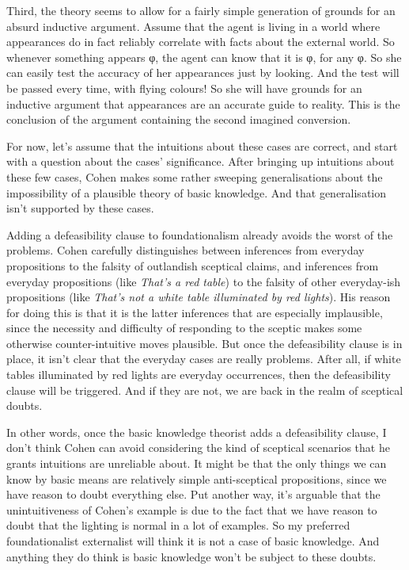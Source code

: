 \documentclass[
  10pt,
  letterpaper,
  twoside]{scrbook}
\begin{document}
Third, the theory seems to allow for a fairly simple generation of
grounds for an absurd inductive argument. Assume that the agent is
living in a world where appearances do in fact reliably correlate with
facts about the external world. So whenever something appears φ, the
agent can know that it is φ, for any φ. So she can easily test the
accuracy of her appearances just by looking. And the test will be passed
every time, with flying colours! So she will have grounds for an
inductive argument that appearances are an accurate guide to reality.
This is the conclusion of the argument containing the second imagined
conversion.

For now, let's assume that the intuitions about these cases are correct,
and start with a question about the cases' significance. After bringing
up intuitions about these few cases, Cohen makes some rather sweeping
generalisations about the impossibility of a plausible theory of basic
knowledge. And that generalisation isn't supported by these cases.

Adding a defeasibility clause to foundationalism already avoids the
worst of the problems. Cohen carefully distinguishes between inferences
from everyday propositions to the falsity of outlandish sceptical
claims, and inferences from everyday propositions (like \emph{That's a
red table}) to the falsity of other everyday-ish propositions (like
\emph{That's not a white table illuminated by red lights}). His reason
for doing this is that it is the latter inferences that are especially
implausible, since the necessity and difficulty of responding to the
sceptic makes some otherwise counter-intuitive moves plausible. But once
the defeasibility clause is in place, it isn't clear that the everyday
cases are really problems. After all, if white tables illuminated by red
lights are everyday occurrences, then the defeasibility clause will be
triggered. And if they are not, we are back in the realm of sceptical
doubts.

In other words, once the basic knowledge theorist adds a defeasibility
clause, I don't think Cohen can avoid considering the kind of sceptical
scenarios that he grants intuitions are unreliable about. It might be
that the only things we can know by basic means are relatively simple
anti-sceptical propositions, since we have reason to doubt everything
else. Put another way, it's arguable that the unintuitiveness of Cohen's
example is due to the fact that we have reason to doubt that the
lighting is normal in a lot of examples. So my preferred foundationalist
externalist will think it is not a case of basic knowledge. And anything
they do think is basic knowledge won't be subject to these doubts.
\end{document}
